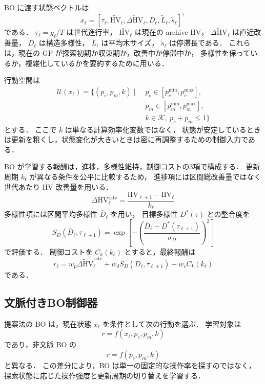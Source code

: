 \documentclass[a4paper,10pt,twocolumn]{ltjsarticle}
\newcommand{\HV}{\mathrm{HV}}
\begin{document}
BO に渡す状態ベクトルは
\begin{equation}
x_\ell =
\left[
\tau_\ell,
\widetilde{\HV}_\ell,
\widetilde{\Delta \HV}_\ell,
D_\ell,
\widetilde{L}_\ell,
\widetilde{s}_\ell
\right]^\top
\end{equation}
である．
\(\tau_\ell=g_\ell/T\) は世代進行率，
\(\widetilde{\HV}_\ell\) は現在の archive HV，
\(\widetilde{\Delta \HV}_\ell\) は直近改善量，
\(D_\ell\) は構造多様性，
\(\widetilde{L}_\ell\) は平均木サイズ，
\(\widetilde{s}_\ell\) は停滞長である．
これらは，現在の GP が探索初期か収束期か，改善中か停滞中か，
多様性を保っているか，複雑化しているかを要約するために用いる．

行動空間は
\begin{equation}
\begin{aligned}
\mathcal{U}(x_\ell)=
\{(p_c,p_m,k)\mid\;&
p_c\in[p_c^{\min},p_c^{\max}],\\
&
p_m\in[p_m^{\min},p_m^{\max}],\\
&
k\in\mathcal{K},\ p_c+p_m\leq 1
\}
\end{aligned}
\end{equation}
とする．
ここで \(k\) は単なる計算効率化変数ではなく，
状態が安定しているときは更新を粗くし，状態変化が大きいときは密に再調整するための制御入力である．

BO が学習する報酬は，進捗，多様性維持，制御コストの3項で構成する．
更新周期 \(k_\ell\) が異なる条件を公平に比較するため，
進捗項には区間総改善量ではなく世代あたり HV 改善量を用いる．
\begin{equation}
\Delta\HV^{\mathrm{rate}}_\ell
=
\frac{\HV_{\ell+1}-\HV_\ell}{k_\ell}
\end{equation}
多様性項には区間平均多様性 \(\bar D_\ell\) を用い，
目標多様性 \(D^\ast(\tau)\) との整合度を
\begin{equation}
S_D(\bar D_\ell,\tau_{\ell+1})=
\exp\left[
-\left(
\frac{\bar D_\ell-D^\ast(\tau_{\ell+1})}{\sigma_D}
\right)^2
\right]
\end{equation}
で評価する．
制御コストを \(C_k(k_\ell)\) とすると，最終報酬は
\begin{equation}
r_\ell =
w_p\widetilde{\Delta\HV}^{\mathrm{rate}}_\ell
+w_dS_D(\bar D_\ell,\tau_{\ell+1})
-w_cC_k(k_\ell)
\end{equation}
である．

\subsection{文脈付きBO制御器}

提案法の BO は，現在状態 \(x_\ell\) を条件として次の行動を選ぶ．
学習対象は
\begin{equation}
r=f(x_\ell,p_c,p_m,k)
\end{equation}
であり，非文脈 BO の
\begin{equation}
r=f(p_c,p_m,k)
\end{equation}
と異なる．
この差分により，BO は単一の固定的な操作率を探すのではなく，
探索状態に応じた操作強度と更新周期の切り替えを学習する．
\end{document}
